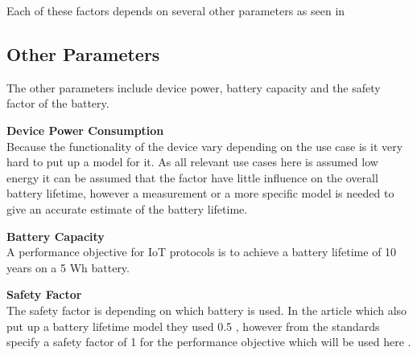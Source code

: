 Each of these factors depends on several other parameters as seen in 

\begin{table}[H]
\centering
{}
\caption{Paremeter overview for each term in the idle energy calculation.}
\label{tab:Eidle_parameter_overview}
\end{table}



\subsection{Other Parameters}
The other parameters include device power, battery capacity and the safety factor of the battery.

\textbf{Device Power Consumption}\\
Because the functionality of the device vary depending on the use case is it very hard to put up a model for it. As all relevant use cases here is assumed low energy it can be assumed that the factor have little influence on the overall battery lifetime, however a measurement or a more specific model is needed to give an accurate estimate of the battery lifetime.

\textbf{Battery Capacity}\\
A performance objective for IoT protocols is to achieve a battery lifetime of 10 years on a 5 Wh battery. 

\textbf{Safety Factor}\\
The safety factor is depending on which battery is used. In the article which also put up a battery lifetime model they used 0.5 \citep{Power_article}, however from the standards specify a safety factor of 1 for the performance objective which will be used here \citep[Sec. 5.4]{safte_factor_standard}.




